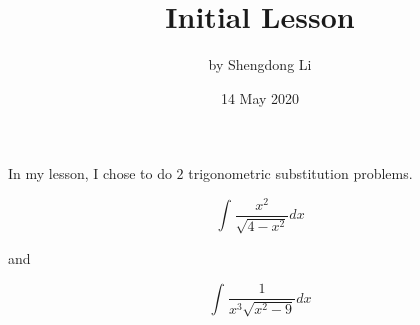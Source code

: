 \documentclass[letterpaper, 12pt]{article}
\begin{document}
\title{Initial Lesson}
\author{by Shengdong Li}
\date{14 May 2020}
\maketitle

In my lesson, I chose to do $2$ trigonometric substitution problems.

\setcounter{equation}{25}
\begin{equation}
\int_{ }^{ }\frac{x^{2}}{\sqrt{4-x^{2}}}dx
\end{equation}
\begin{center}
   and
\end{center}
\setcounter{equation}{40}
\begin{equation}
\int_{ }^{ }\frac{1}{x^{3}\sqrt{x^{2}-9}}dx
\end{equation}
\end{document}
